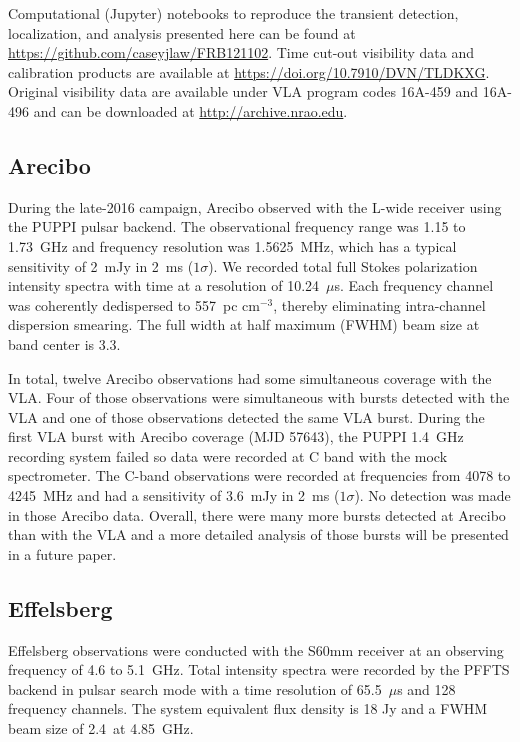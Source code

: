 \documentclass[twocolumn]{aastex61}
\begin{document}
Computational (Jupyter) notebooks to reproduce the transient detection, localization, and analysis presented here can be found at \url{https://github.com/caseyjlaw/FRB121102}. Time cut-out visibility data and calibration products are available at \url{https://doi.org/10.7910/DVN/TLDKXG}. Original visibility data are available under VLA program codes 16A-459 and 16A-496 and can be downloaded at \url{http://archive.nrao.edu}.

\subsection{Arecibo}

During the late-2016 campaign, Arecibo observed with the L-wide receiver using the PUPPI pulsar backend. The observational frequency range was 1.15 to 1.73~GHz and frequency resolution was 1.5625~MHz, which has a typical sensitivity of 2~mJy in 2~ms ($1\sigma$). We recorded total full Stokes polarization intensity spectra with time at a resolution of 10.24~$\mu$s. Each frequency channel was coherently dedispersed to 557~pc cm$^{-3}$, thereby eliminating intra-channel dispersion smearing. The full width at half maximum (FWHM) beam size at band center is 3.3\arcmin.

In total, twelve Arecibo observations had some simultaneous coverage with the VLA. Four of those observations were simultaneous with bursts detected with the VLA and one of those observations detected the same VLA burst. During the first VLA burst with Arecibo coverage (MJD 57643), the PUPPI 1.4~GHz recording system failed so data were recorded at C band with the mock spectrometer. The C-band observations were recorded at frequencies from 4078 to 4245~MHz and had a sensitivity of 3.6~mJy in 2~ms ($1\sigma$). No detection was made in those Arecibo data. Overall, there were many more bursts detected at Arecibo than with the VLA and a more detailed analysis of those bursts will be presented in a future paper.

\subsection{Effelsberg}

Effelsberg observations were conducted with the S60mm receiver at an observing frequency of 4.6 to 5.1~GHz. Total intensity spectra were recorded by the PFFTS backend in pulsar search mode with a time resolution of 65.5~$\mu$s and 128 frequency channels. The system equivalent flux density is 18 Jy and a FWHM beam size of 2.4\arcmin\ at 4.85~GHz. 
\end{document}
